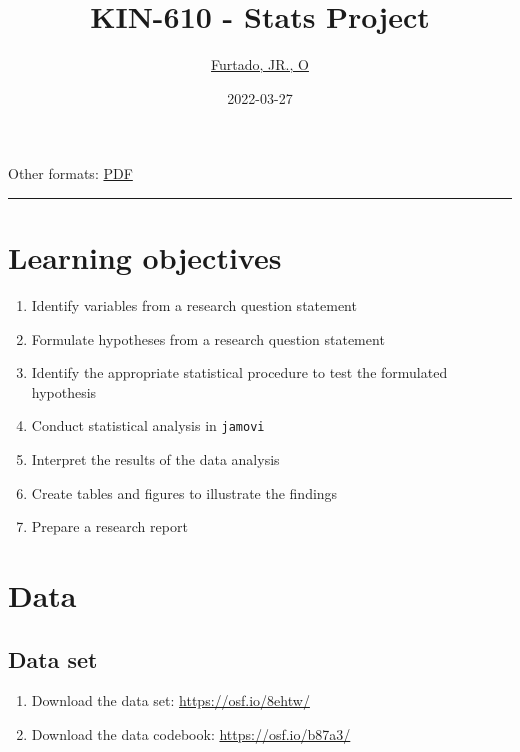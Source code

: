 \documentclass[
]{article}
\title{KIN-610 - Stats Project}
\author{\href{http://drfurtado.us}{Furtado, JR., O}}
\date{2022-03-27}
\providecommand{\tightlist}{%
  \setlength{\itemsep}{0pt}\setlength{\parskip}{0pt}}
\begin{document}
\maketitle

{
\setcounter{tocdepth}{2}
\tableofcontents
}
Other formats: \href{project1.pdf}{PDF}

\begin{center}\rule{0.5\linewidth}{0.5pt}\end{center}

\hypertarget{learning-objectives}{%
\section{Learning objectives}\label{learning-objectives}}

\begin{enumerate}
\def\labelenumi{\arabic{enumi}.}
\tightlist
\item
  Identify variables from a research question statement
\item
  Formulate hypotheses from a research question statement
\item
  Identify the appropriate statistical procedure to test the formulated hypothesis
\item
  Conduct statistical analysis in \texttt{jamovi}
\item
  Interpret the results of the data analysis
\item
  Create tables and figures to illustrate the findings
\item
  Prepare a research report
\end{enumerate}

\hypertarget{data}{%
\section{Data}\label{data}}

\hypertarget{data-set}{%
\subsection{Data set}\label{data-set}}

\begin{enumerate}
\def\labelenumi{\arabic{enumi}.}
\tightlist
\item
  Download the data set: \url{https://osf.io/8ehtw/}
\item
  Download the data codebook: \url{https://osf.io/b87a3/}
\end{enumerate}
\end{document}
